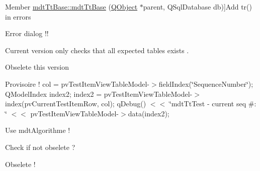 \begin{DoxyRefList}
\hypertarget{todo__todo000064}{}%
Member \hyperlink{classmdt_tt_base_a6dbd221d1518e30c3692a7ba54b57c03}{mdt\-Tt\-Base\-:\-:mdt\-Tt\-Base} (\hyperlink{class_q_object}{Q\-Object} $\ast$parent, Q\-Sql\-Database db)]Add tr() in errors  
\item[\label{todo__todo000066}%
\hypertarget{todo__todo000066}{}%
Member \hyperlink{classmdt_tt_basic_tester_window_a55ed2ee382f4d560e5c5e055e69b7a6d}{mdt\-Tt\-Basic\-Tester\-Window\-:\-:init} ()]Error dialog !!  
\item[\label{todo__todo000068}%
\hypertarget{todo__todo000068}{}%
Member \hyperlink{classmdt_tt_database_schema_ace92b340a68ce07ad477502a68de4514}{mdt\-Tt\-Database\-Schema\-:\-:check\-Schema} ()]Current version only checks that all expected tables exists . 
\item[\label{todo__todo000080}%
\hypertarget{todo__todo000080}{}%
Member \hyperlink{classmdt_tt_logical_test_cable_a5abe6257d4ca126550b9ca9fb31a1ebc}{mdt\-Tt\-Logical\-Test\-Cable\-:\-:add\-Link} (const Q\-Variant \&test\-Connection\-Id, const Q\-Variant \&dut\-Connection\-Id, const Q\-Variant \&test\-Cable\-Id, const Q\-Variant \&identification, const Q\-Variant \&value)]Obselete this version  
\item[\label{todo__todo000082}%
\hypertarget{todo__todo000082}{}%
Member \hyperlink{classmdt_tt_test_a71e868fa2c182b33982276e52f9c4d23}{mdt\-Tt\-Test\-:\-:get\-Setup\-Data} (const Q\-Variant \&test\-Model\-Item\-Id, bool \&ok)]Provisoire ! col = pv\-Test\-Item\-View\-Table\-Model-\/$>$field\-Index(\char`\"{}\-Sequence\-Number\char`\"{}); Q\-Model\-Index index2; index2 = pv\-Test\-Item\-View\-Table\-Model-\/$>$index(pv\-Current\-Test\-Item\-Row, col); q\-Debug() $<$$<$ \char`\"{}mdt\-Tt\-Test -\/ current seq \#\-: \char`\"{} $<$$<$ pv\-Test\-Item\-View\-Table\-Model-\/$>$data(index2); 
\item[\label{todo__todo000081}%
\hypertarget{todo__todo000081}{}%
Member \hyperlink{classmdt_tt_test_a5920961d0f32d37033a184ed76b2cf3d}{mdt\-Tt\-Test\-:\-:is\-In\-Range} (double x, double min, double max=std\-::numeric\-\_\-limits$<$ double $>$\-::max())]Use mdt\-Algorithme !  
\item[\label{todo__todo000085}%
\hypertarget{todo__todo000085}{}%
Class \hyperlink{classmdt_tt_test_data}{mdt\-Tt\-Test\-Data} ]Check if not obselete ?  
\item[\label{todo__todo000086}%
\hypertarget{todo__todo000086}{}%
Member \hyperlink{classmdt_tt_test_item_node_setup_data_a2c58ca8c543b503e7d96d3f13112078f}{mdt\-Tt\-Test\-Item\-Node\-Setup\-Data\-:\-:add\-Node\-Setup\-Data} (const \hyperlink{classmdt_tt_test_node_setup_data}{mdt\-Tt\-Test\-Node\-Setup\-Data} \&data)]Obselete !  

\end{DoxyRefList}
